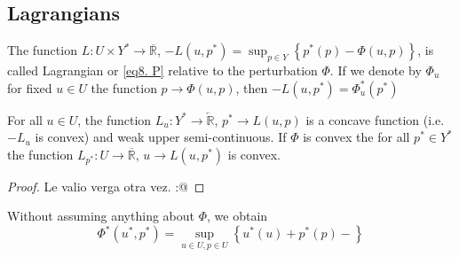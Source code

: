 \subsection{Lagrangians}
\begin{definition}
	The function $L:U\times Y^* \rightarrow \overline{\mathbb{R}}$, $-L(u, p^*)=\sup_{p\in Y} \left\lbrace p^*(p) - \Phi(u, p)
	\right\rbrace$, is called Lagrangian or \eqref{eq8. P} relative to the perturbation $\Phi$. If we denote by $\Phi_u$ for fixed $u\in U$ the function $p\rightarrow \Phi(u, p)$, then $-L(u, p^*)=\Phi^*_u(p^*)$
\end{definition}

\begin{lemma}
	For all $u\in U$, the function $L_u: Y^* \rightarrow \overleftarrow{\mathbb{R}}$, $p^*\rightarrow L(u, p)$ is  a concave function (i.e. $-L_u$ is convex) and weak upper semi-continuous. If $\Phi$ is convex the for all $p^* \in Y^*$ the function $L_{p^*}: U\rightarrow \overline{\mathbb{R}}$, $u\rightarrow L(u, p^*)$ is convex.
	\begin{proof}
		Le valio verga otra vez. :@ 
	\end{proof}
\end{lemma}

Without assuming anything about $\Phi$, we obtain
\[
	\Phi^*(u^*, p^*) = \sup_{u\in U, p\in U} \left\lbrace u^*(u) + p^*(p) - 
	\right\rbrace
\]